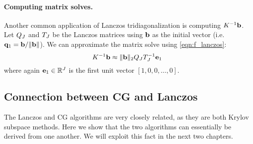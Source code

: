 \paragraph{Computing matrix solves.}
Another common application of Lanczos tridiagonalization is computing $K^{-1} \mathbf{b}$.
Let $Q_J$ and $T_J$ be the Lanczos matrices using $\mathbf{b}$ as the initial vector (i.e. $\mathbf{q}_1 = \mathbf{b} / \Vert \mathbf{b} \Vert$).
We can approximate the matrix solve using \cref{eqn:f_lanczos}:
%
\begin{equation}
  K^{-1} \mathbf{b} \approx \Vert \mathbf{b} \Vert_2 Q_J T_J^{-1} \mathbf{e}_{1}
  \label{eqn:lanczos_solves}
\end{equation}
%
where again $\mathbf{e}_{1} \in \mathbb{R}^J$ is the first unit vector $[1, 0, 0, \ldots, 0]$.




\subsection{Connection between CG and Lanczos}
\label{sec:cg_lanczos_connection}

The Lanczos and CG algorithms are very closely related, as they are both Krylov subspace methods.
Here we show that the two algorithms can essentially be derived from one another.
We will exploit this fact in the next two chapters.

